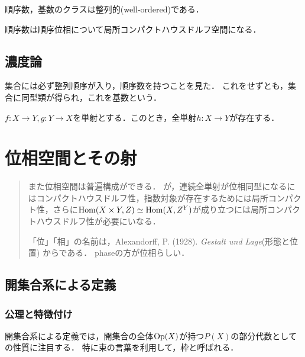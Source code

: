 \documentclass[uplatex,dvipdfmx]{jsreport}
\begin{document}
\begin{proposition}
    順序数，基数のクラスは整列的(well-ordered)である．
\end{proposition}

\begin{proposition}
    順序数は順序位相について局所コンパクトハウスドルフ空間になる．
\end{proposition}

\section{濃度論}

\begin{tcolorbox}[colframe=ForestGreen, colback=ForestGreen!10!white,breakable,colbacktitle=ForestGreen!40!white,coltitle=black,fonttitle=\bfseries\sffamily,
title=]
    集合には必ず整列順序が入り，順序数を持つことを見た．
    これをせずとも，集合に同型類が得られ，これを基数という．
\end{tcolorbox}

\begin{proposition}[Bernstein, 1897]
    $f:X\to Y,g:Y\to X$を単射とする．このとき，全単射$h:X\to Y$が存在する．
\end{proposition}

\chapter{位相空間とその射}

\begin{quotation}
    また位相空間は普遍構成ができる．
    が，連続全単射が位相同型になるにはコンパクトハウスドルフ性，指数対象が存在するためには局所コンパクト性，さらに$\mathrm{Hom}(X\times Y,Z)\simeq\mathrm{Hom}(X,Z^Y)$が成り立つには局所コンパクトハウスドルフ性が必要にいなる．

    「位」「相」の名前は，Alexandorff, P. (1928). \textit{Gestalt und Lage}(形態と位置) からである．
    phaseの方が位相らしい．
\end{quotation}

\section{開集合系による定義}

\subsection{公理と特徴付け}

\begin{tcolorbox}[colframe=ForestGreen, colback=ForestGreen!10!white,breakable,colbacktitle=ForestGreen!40!white,coltitle=black,fonttitle=\bfseries\sffamily,
title=]
    開集合系による定義では，開集合の全体$\mathrm{Op}(X)$が持つ$P(X)$の部分代数としての性質に注目する．
    特に束の言葉を利用して，枠と呼ばれる．
\end{tcolorbox}
\end{document}

